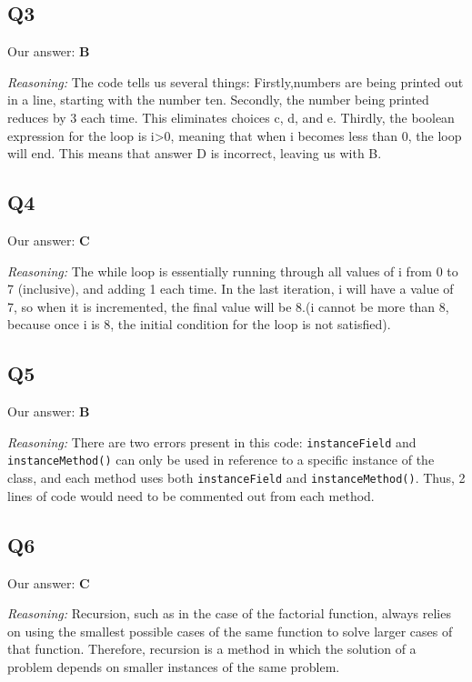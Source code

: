 \documentclass{article}
\begin{document}
\subsection{Q3}

Our answer: \textbf{B}

\noindent\textit{Reasoning:} The code tells us several things: 
Firstly,numbers are being printed out in a line, starting with the number ten. Secondly, the number being printed reduces by 3 each time. This eliminates choices c, d, and e. Thirdly, the boolean expression for the loop is i>0, meaning that when i becomes less than 0, the loop will end. This means that answer D is incorrect, leaving us with B. 

\subsection{Q4}

Our answer: \textbf{C}

\noindent\textit{Reasoning:} The while loop is essentially running through all values of i from 0 to 7 (inclusive), and adding 1 each time. In the last iteration, i will have a value of 7, so when it is incremented, the final value will be 8.(i cannot be more than 8, because once i is 8, the initial condition for the loop is not satisfied). 

\subsection{Q5}

Our answer: \textbf{B}

\noindent\textit{Reasoning:} There are two errors present in this code: \verb|instanceField| and \verb|instanceMethod()| can only be used in reference to a specific instance of the class, and each method uses both \verb|instanceField| and \verb|instanceMethod()|. Thus, 2 lines of code would need to be commented out from each method. 


\subsection{Q6}

Our answer: \textbf{C}

\noindent\textit{Reasoning:} Recursion, such as in the case of the factorial function, always relies on using the smallest possible cases of the same function to solve larger cases of that function. Therefore, recursion is a method in which the solution of a problem depends on smaller instances of the same problem. 
\end{document}
